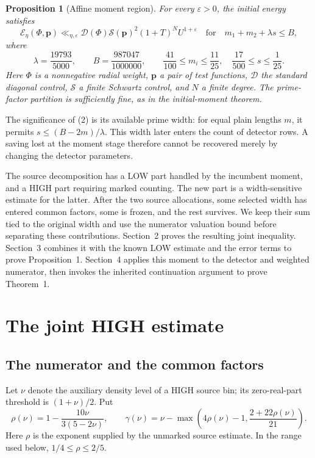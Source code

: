 \documentclass[10pt,a4paper]{article}
\newtheorem{proposition}{Proposition}
\begin{document}
\begin{proposition}[Affine moment region]
For every $\varepsilon>0$, the initial energy satisfies
\[
 \mathcal E_\eta(\Phi,\mathbf p)\ll_{\eta,\varepsilon}
       \mathcal D(\Phi)\mathcal S(\mathbf p)^2(1+T)^N U^{1+\varepsilon}
 \quad\text{for}\quad m_1+m_2+\lambda s\le B,              \tag{2}
\]
where
\[
 \lambda=\frac{19793}{5000},\qquad B=\frac{987047}{1000000},\qquad
 \frac{41}{100}\le m_i\le\frac{11}{25},\quad
 \frac{17}{500}\le s\le\frac1{25}.
\]
Here $\Phi$ is a nonnegative radial weight, $\mathbf p$ a pair of test
functions, $\mathcal D$ the standard diagonal control, $\mathcal S$ a finite
Schwartz control, and $N$ a finite degree. The prime-factor partition is
sufficiently fine, as in the initial-moment theorem.
\end{proposition}
The significance of (2) is its available prime width: for equal plain
lengths $m$, it permits $s\le(B-2m)/\lambda$. This width later enters the
count of detector rows. A saving lost at the moment stage therefore cannot
be recovered merely by changing the detector parameters.

The source decomposition has a LOW part handled by the incumbent moment,
and a HIGH part requiring marked counting. The new part is a width-sensitive
estimate for the latter. After the two source
allocations, some selected width has entered common factors, some is frozen,
and the rest survives. We keep their sum tied to the original width and
use the numerator valuation bound before separating these contributions.
Section~2 proves the resulting joint inequality. Section~3 combines it with
the known LOW estimate and the error terms to prove Proposition~1.
Section~4 applies this moment to the detector and weighted numerator,
then invokes the inherited continuation argument to prove Theorem~1.

\newpage
\section{The joint HIGH estimate}
\subsection*{The numerator and the common factors}
Let $\nu$ denote the auxiliary density level of a HIGH source bin; its
zero-real-part threshold is $(1+\nu)/2$. Put
\[
 \rho(\nu)=1-\frac{10\nu}{3(5-2\nu)},\qquad
 \gamma(\nu)=\nu-
       \max\left(4\rho(\nu)-1,\frac{2+22\rho(\nu)}{21}\right). \tag{3}
\]
Here $\rho$ is the exponent supplied by the unmarked source estimate.
In the range used below, $1/4\le\rho\le2/5$.
\end{document}
